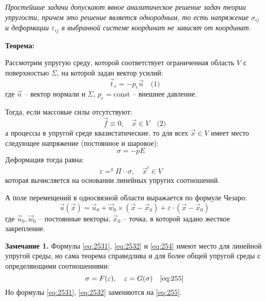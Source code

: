 

\textit{Простейшие задачи допускают явное аналитическое решение задач теории упругости, причем это решение является однородным, то есть напряжение \( \sigma_{ij} \) и деформации \( \varepsilon_{ij} \) в выбранной системе координат не зависят от координат.
}
\par
\textbf{Теорема:}

Рассмотрим упругую среду, которой соответствует ограниченная область \( V \) с поверхностью \( \Sigma \), на которой задан вектор усилий:
\begin{equation}
\vec{t}_e = - p_e \vec{n} \quad \text{(1)}
\end{equation}
где \( \vec{n} \) – вектор нормали и \( \Sigma \), \( p_e = \text{const} \) – внешнее давление.

Тогда, если массовые силы отсутствуют:
\begin{equation}
\vec{f} \equiv 0, \quad \vec{x} \in V \quad \text{(2)}
\end{equation}
а процессы в упругой среде квазистатические, то для всех \( \vec{x} \in V \) имеет место следующее напряжение (постоянное и шаровое):
\begin{equation}
\sigma = - p E \quad \label{eq:2531}
\end{equation}
Деформация тогда равна:
\begin{equation}
\varepsilon = ^4\Pi \cdot \cdot \sigma, \quad \vec{x}^i \in V \quad \label{eq:2532}
\end{equation}
которая вычисляется на основании линейных упругих соотношений.

А поле перемещений в односвязной области выражается по формуле Чезаро:
\begin{equation}
\vec{u}(\vec{x}) = \vec{u}_0 + \vec{w}_0 \times (\vec{x} - \vec{x}_0) + \varepsilon \cdot (\vec{x} - \vec{x}_0) \label{eq:254}
\end{equation}
где \( \vec{u}_0, \vec{w}_0 \) – постоянные векторы, \( \vec{x}_0 \) – точка, в которой задано жесткое закрепление.

\textbf{Замечание 1.} Формулы \ref{eq:2531}, \ref{eq:2532} и \ref{eq:254} имеют место для линейной упругой среды, но сама теорема справедлива и для более общей упругой среды с определяющими соотношениями:
\begin{equation}
\sigma = F(\varepsilon), \quad \varepsilon = G(\sigma) \quad \text{\ref{eq:255}}
\end{equation}
Но формулы \ref{eq:2531}, \ref{eq:2532} заменяются на \ref{eq:255}.

